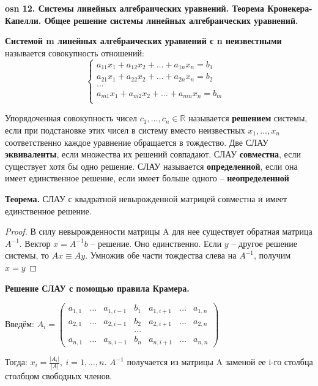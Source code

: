 \textbf{\LARGE osn 12. Системы линейных алгебраических уравнений. Теорема Кронекера-Капелли. Общее решение системы линейных алгебраических уравнений.}

\textbf{Системой m линейных алгебраических уравнений с n неизвестными} называется совокупность отношений:
    $$\begin{cases}
        a_{11}x_1 + a_{12}x_2+\dots+a_{1n}x_n = b_1&\\
        a_{21}x_1 + a_{22}x_2+\dots+a_{2n}x_n = b_2&\\
        \dots&\\
        a_{m1}x_1 + a_{m2}x_2+\dots+a_{mn}x_n = b_m&\\
    \end{cases}$$
    
Упорядоченная совокупность чисел $c_1, ..., c_n \in\mathbb{R}$ называется \textbf{решением} системы, если при подстановке этих чисел в систему вместо неизвестных $x_1, ..., x_n$ соответственно каждое уравнение обращается в тождество.
Две СЛАУ \textbf{эквиваленты}, если множества их решений совпадают.
СЛАУ \textbf{совместна}, если существует хотя бы одно решение.
СЛАУ называется \textbf{определенной}, если она имеет единственное решение, если имеет больше одного -- \textbf{неопределенной}


\textbf{Теорема.} СЛАУ с квадратной невырожденной матрицей совместна и имеет единственное решение.

\begin{proof}
В силу невырожденности матрицы A для нее существует обратная матрица $A^{-1}$.
Вектор $x = A^{-1}b$ -- решение. Оно единственно. Если $y$ -- другое решение системы, то $Ax \equiv Ay$. Умножив обе части тождества слева на $A^{-1}$, получим $x = y$
\end{proof}

\textbf{Решение СЛАУ с помощью правила Крамера.}

Введём:
$A_i = \begin{pmatrix} a_{1,1} & \dots & a_{1,i-1} & b_1 & a_{1,i+1} & \dots & a_{1,n} \\
           a_{2,1} & \dots & a_{2,i-1} & b_2 & a_{2,i+1} & \dots & a_{2,n} \\
            & & & \dots & & & \\
           a_{n,1} & \dots & a_{n,i-1} & b_n & a_{n,i+1} & \dots & a_{n,n}
\end{pmatrix}$

Тогда: $x_i = \frac{|A_i|}{|A|},~i=1,\dots,n$. $A^{-1}$ получается из матрицы A заменой ее i-го столбца столбцом свободных членов.

